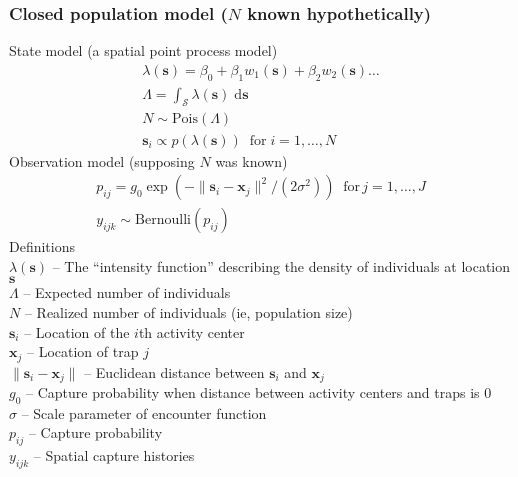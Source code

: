 \documentclass[color=usenames,dvipsnames]{beamer}\usepackage[]{graphicx}\usepackage[]{color}
\newcommand{\bxj}{{\bm x}_j}
\newcommand{\bs}{{\bm s}}
\newcommand{\bsi}{{\bm s}_i}
\newcommand{\dsixj}{\|\bsi - \bxj\|}
\begin{document}
\begin{frame}
  \frametitle{\large Closed population model ($N$ known hypothetically) }
  \footnotesize
  State model (a spatial point process model) %
  \begin{gather*}
    \lambda(\bs) = \beta_0 + \beta_1 w_1(\bs) + \beta_2 w_2(\bs) \dots \\
    \Lambda = \int_{\mathcal{S}} \lambda(\bs) \; \mathrm{d}\bs \\
    N \sim \mathrm{Pois}(\Lambda) \\
    \bsi \propto p(\lambda(\bs)) \;\; \mathrm{for}\; i=1,\dots,N 
  \end{gather*}
  Observation model (supposing $N$ was known)
  \begin{gather*}
    p_{ij} = g_0\exp(-\|\bsi - \bxj\|^2/(2\sigma^2))  \;\; \mathrm{for}\, j=1,\dots,J  \\
    y_{ijk} \sim \mathrm{Bernoulli}(p_{ij})
  \end{gather*}
  \scriptsize
  Definitions \\
  \hangindent=0.9cm $\lambda(\bs)$ -- The ``intensity function'' %
  describing the density of individuals at location $\bs$ \\ 
  $\Lambda$ -- Expected number of individuals \\
  $N$ -- Realized number of individuals (ie, population size) \\
  $\bsi$ -- Location of the $i$th activity center \\
  $\bxj$ -- Location of trap $j$ \\
  $\dsixj$ -- Euclidean distance between $\bsi$ and $\bxj$ \\
  $g_0$ -- Capture probability when distance between activity centers
  and traps is 0 \\
  $\sigma$ -- Scale parameter of encounter function \\
  $p_{ij}$ -- Capture probability \\
  $y_{ijk}$ -- Spatial capture histories \\
\end{frame}
\end{document}
